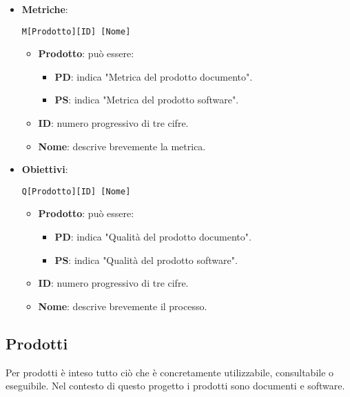 	\begin{itemize}

		\item \textbf{Metriche}:
		
		\begin{center}
			\texttt{M[Prodotto][ID] [Nome]}
		\end{center}
	
		\begin{itemize}
			\item \textbf{Prodotto}: può essere:
			\begin{itemize}
				\item \textbf{PD}: indica "Metrica del prodotto documento".
				\item \textbf{PS}: indica "Metrica del prodotto software".
			\end{itemize}
			\item \textbf{ID}: numero progressivo di tre cifre.
			\item \textbf{Nome}: descrive brevemente la metrica.
		\end{itemize}

		\item \textbf{Obiettivi}: 
		
		\begin{center}
			\texttt{Q[Prodotto][ID] [Nome]}
		\end{center} 
		
		\begin{itemize}
			\item \textbf{Prodotto}: può essere:
			\begin{itemize}
				\item \textbf{PD}: indica "Qualità del prodotto documento".
				\item \textbf{PS}: indica "Qualità del prodotto software".
			\end{itemize}
			\item \textbf{ID}: numero progressivo di tre cifre.
			\item \textbf{Nome}: descrive brevemente il processo.
		\end{itemize}
		
		
	\end{itemize}


\subsection{Prodotti} 
Per prodotti è inteso tutto ciò che è concretamente utilizzabile, consultabile o eseguibile.
Nel contesto di questo progetto i prodotti sono documenti e software.

